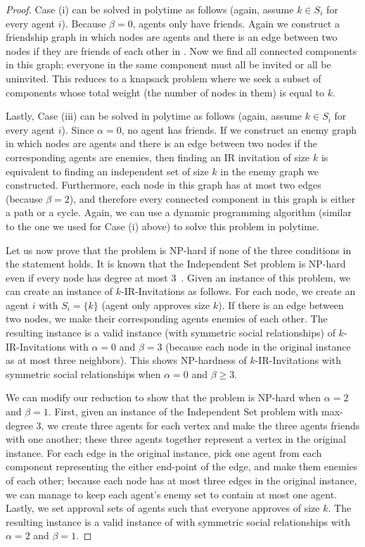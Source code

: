 \begin{proof}
 	Case (i) can be solved in polytime as follows (again, assume $k \in S_i$ for every agent $i$). Because $\beta = 0$, agents only have friends. Again we construct a friendship graph in which nodes are agents and there is an edge between two nodes if they are friends of each other in \SIP. Now we find all connected components in this graph; everyone in the same component must all be invited or all be uninvited. This reduces to a knapsack problem where we seek a subset of components whose total weight (the number of nodes in them) is equal to $k$. 

	Lastly, Case (iii) can be solved in polytime as follows (again, assume $k \in S_i$ for every agent $i$).
	Since $\alpha = 0$, no agent has friends. If we construct an enemy graph in which nodes are agents and there is an edge between two nodes if the corresponding agents are enemies, then finding an IR invitation of size $k$ is equivalent to finding an independent set of size $k$ in the enemy graph we constructed. Furthermore, each node in this graph has at most two edges (because $\beta = 2$), and therefore every connected component in this graph is either a path or a cycle. Again, we can use a dynamic programming algorithm (similar to the one we used for Case (i) above) to solve this problem in polytime.

		
	Let us now prove that the problem is NP-hard if none of the three conditions in the statement holds. 
	It is known that the Independent Set problem is NP-hard even if every node has degree at most 3~\cite{Garey_Max_Is_Cubic}. 
	Given an instance of this problem, we can create an instance of $k$-IR-Invitations as follows. 
	For each node, we create an agent $i$ with $S_i =\{k\}$ (agent only approves size $k$). 
	If there is an edge between two nodes, we make their corresponding agents enemies of each other. 
	The resulting instance is a valid instance (with symmetric social relationships) of $k$-IR-Invitations with $\alpha = 0$ and $\beta = 3$ (because each node in the original instance as at most three neighbors). 
	This shows NP-hardness of $k$-IR-Invitations with symmetric social relationships when $\alpha = 0$ and $\beta \geq 3$.	
	
	We can modify our reduction to show that the problem is NP-hard when $\alpha = 2$ and $\beta = 1$.
	First, given an instance of the Independent Set problem with max-degree 3, we create three agents for each vertex and make the three agents friends with one another; these three agents together represent a vertex in the original instance.
	For each edge in the original instance, pick one agent from each component representing the either end-point of the edge, and make them enemies of each other; because each node has at most three edges in the original instance, we can manage to keep each agent's enemy set to contain at most one agent. Lastly, we set approval sets of agents such that everyone approves of size $k$. The resulting instance is a valid instance of \SIPs with symmetric social relationships with $\alpha = 2$ and $\beta = 1$. 
	

\end{proof}
